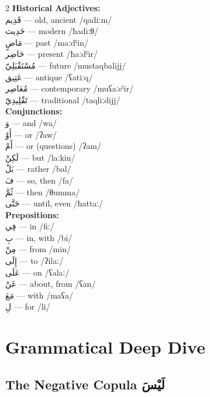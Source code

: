 \documentclass[letterpaper,12pt]{article}
\begin{document}
\begin{multicols}{2}
\textbf{Historical Adjectives:}\\
\textarabic{قَدِيم} — old, ancient /qadiːm/\\
\textarabic{حَدِيث} — modern /ħadiːθ/\\
\textarabic{مَاضٍ} — past /maːdˤin/\\
\textarabic{حَاضِر} — present /ħaːdˤir/\\
\textarabic{مُسْتَقْبَلِيّ} — future /mustaqbalijj/\\
\textarabic{عَتِيق} — antique /ʕatiːq/\\
\textarabic{مُعَاصِر} — contemporary /muʕaːsˤir/\\
\textarabic{تَقْلِيدِيّ} — traditional /taqliːdijj/\\

\textbf{Conjunctions:}\\
\textarabic{وَ} — and /wa/\\
\textarabic{أَوْ} — or /ʔaw/\\
\textarabic{أَمْ} — or (questions) /ʔam/\\
\textarabic{لَكِنْ} — but /laːkin/\\
\textarabic{بَلْ} — rather /bal/\\
\textarabic{فَ} — so, then /fa/\\
\textarabic{ثُمَّ} — then /θumma/\\
\textarabic{حَتَّى} — until, even /ħattaː/\\

\textbf{Prepositions:}\\
\textarabic{فِي} — in /fiː/\\
\textarabic{بِ} — in, with /bi/\\
\textarabic{مِنْ} — from /min/\\
\textarabic{إِلَى} — to /ʔilaː/\\
\textarabic{عَلَى} — on /ʕalaː/\\
\textarabic{عَنْ} — about, from /ʕan/\\
\textarabic{مَعَ} — with /maʕa/\\
\textarabic{لِ} — for /li/\\
\end{multicols}

\section{Grammatical Deep Dive}

\subsection{The Negative Copula \textarabic{لَيْسَ}}
\end{document}
